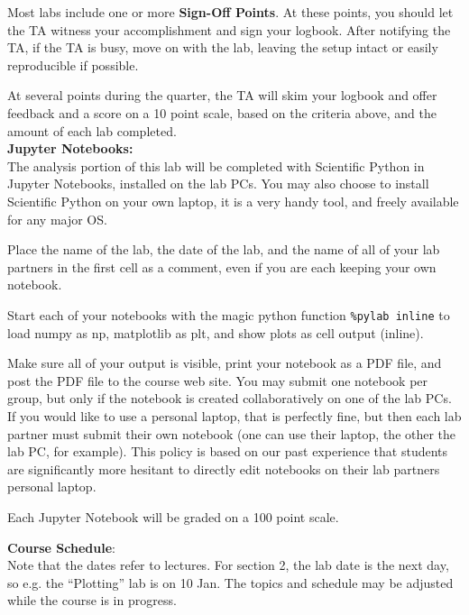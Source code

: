 \documentclass[12pt]{article}
\begin{document}
Most labs include one or more {\bf Sign-Off Points}.  At these points,
you should let the TA witness your accomplishment and sign your
logbook. After notifying the TA, if the TA is busy, move on with the
lab, leaving the setup intact or easily reproducible if possible.

At several points during the quarter, the TA will skim your logbook
and offer feedback and a score on a 10 point scale, based on the
criteria above, and the amount of each lab completed.\\

\noindent
\textbf {Jupyter Notebooks:}\\ 
The analysis portion of this lab will be completed with Scientific
Python in Jupyter Notebooks, installed on the lab PCs.  You may also
choose to install Scientific Python on your own laptop, it is a very
handy tool, and freely available for any major OS.

Place the name of the lab, the date of the lab, and the name of all of
your lab partners in the first cell as a comment, even if you are each
keeping your own notebook.

Start each of your notebooks with the magic python function
{\tt\%pylab inline} to load numpy as np, matplotlib as plt, and show
plots as cell output (inline).

Make sure all of your output is visible, print your notebook as a PDF
file, and post the PDF file to the course web site.  You may submit
one notebook per group, but only if the notebook is created
collaboratively on one of the lab PCs.  If you would like to use a
personal laptop, that is perfectly fine, but then each lab partner
must submit their own notebook (one can use their laptop, the other
the lab PC, for example).  This policy is based on our past experience
that students are significantly more hesitant to directly edit
notebooks on their lab partners personal laptop.

Each Jupyter Notebook will be graded on a 100 point scale.\\

\newpage

\noindent
\textbf {Course Schedule}:\\
Note that the dates refer to lectures.  For section 2, the lab date is the next day, so e.g. the ``Plotting'' lab is on 10 Jan.  The topics and schedule may be adjusted while the course is in progress.
\end{document}
